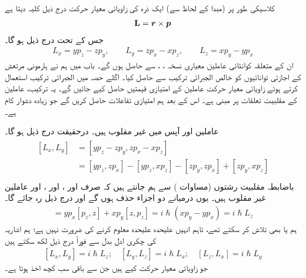  کلاسیکی طور پر (مبدا کے لحاظ سے) ایک ذرہ کی زاویائی معیار حرکت درج ذیل کلیہ دیتا ہے 
\begin{align}
\operatorname{\mathbf{L}}={{\boldsymbol{r}}}\times{\ensuremath{{\boldsymbol{p}}}}
\end{align}
جس کے تحت درج ذیل ہو گا۔
\begin{align}\label{مساوات_تین_ابعادی_متعدد_رشتے}
L_{x}=yp_{z}-zp_{y}, \quad\quad L_{y}=zp_{x}-xp_{z}, \quad \quad L_{z}=xp_{y}-yp_{x}
\end{align}
ان کے متعلقہ کوانٹائی عاملین معیاری نسخہ ، ،  سے حاصل ہوں گے۔ باب  میں ہم نے ہارمونی مرتعش کے اجازتی توانائیوں کو خالص الجبرائی ترکیب سے حاصل کیا۔ اگلے حصہ میں الجبرائی ترکیب استعمال کرتے ہوئے زاویائی معیار حرکت عاملین کے امتیازی قیمتیں حاصل کیے جائیں گے۔ یہ ترکیب، عاملین کے مقلبیت تعلقات پر مبنی ہے۔ اس کے بعد ہم امتیازی تفاعلات حاصل کریں گے جو زیادہ دشوار کام ہے۔

عاملین  اور  آپس میں غیر مقلوب ہیں۔ درحقیقت درج ذیل ہو گا۔
\begin{gather}
\begin{aligned}
[L_{x},L_{y}]&=[yp_{z}-zp_{y},zp_{x}-xp_{z}]\\
&=[yp_{z},zp_{x}]-[yp_{z},xp_{z}]-[zp_{y},zp_{x}]+[zp_{y},xp_{z}]\\
\end{aligned}
\end{gather}
باضابطہ مقلبیت رشتوں (مساوات ) سے ہم جانتے ہیں کہ صرف  اور ،  اور ،  اور  عاملین غیر مقلوب ہیں۔ یوں درمیانے دو اجزاء حذف ہوں گے اور درج ذیل رہ جائے گا۔
\begin{align}
[L_x, L_y] = y p_x [p_z, z] + x p_y [z, p_z] = i \hslash (x p_y - y p_x) = i \hslash L_z
\end{align}
ہم  یا  بھی تلاش کر سکتے تھے، تاہم انہیں علیحدہ علیحدہ معلوم کرنے کی ضرورت نہیں ہے؛ ہم اشاریہ کی
 چکری ادل بدل  سے فوراً درج ذیل لکھ سکتے ہیں 
\begin{align}\label{مساوات_تین_ابعادی_بنیادی_مقلبیت_رشتہ}
[L_x, L_y] = i \hslash L_z ; \quad [L_y, L_z] = i \hslash L_x ; \quad [L_z, L_x] = i \hslash L_y
\end{align}
جو زاویائی معیار حرکت کیے ہیں جن سے باقی سب کچھ اخذ ہوتا ہے۔

